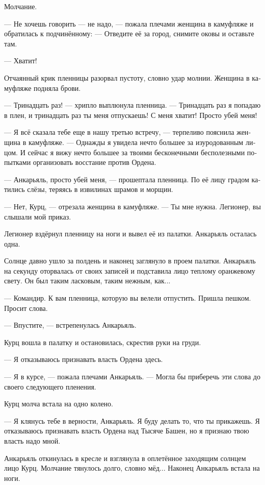 \documentclass[a4paper,10pt,fleqn]{book}\usepackage{polyglossia}\setdefaultlanguage[babelshorthands=true]{russian}\setotherlanguage{english}\defaultfontfeatures{Ligatures=TeX,Mapping=tex-text}\usepackage{xcolor}\newcommand{\ml}[3]{#2}
\begin{document}
Молчание.

--- Не хочешь говорить --- не надо, --- пожала плечами женщина в камуфляже и обратилась к подчинённому:
--- Отведите её за город, снимите оковы и оставьте там.

--- Хватит!

Отчаянный крик пленницы разорвал пустоту, словно удар молнии.
Женщина в камуфляже подняла брови.

--- Тринадцать раз! --- хрипло выплюнула пленница.
--- Тринадцать раз я попадаю в плен, и тринадцать раз ты меня отпускаешь!
С меня хватит!
Просто убей меня!

--- Я всё сказала тебе еще в нашу третью встречу, --- терпеливо пояснила женщина в камуфляже.
--- Однажды я увидела нечто большее за изуродованным лицом.
И сейчас я вижу нечто большее за твоими бесконечными бесполезными попытками организовать восстание против Ордена.

--- Анкарьяль, просто убей меня, --- прошептала пленница.
По её лицу градом катились слёзы, теряясь в извилинах шрамов и морщин.

--- Нет, Курц, --- отрезала женщина в камуфляже.
--- Ты мне нужна.
Легионер, вы слышали мой приказ.

Легионер вздёрнул пленницу на ноги и вывел её из палатки.
Анкарьяль осталась одна.

Солнце давно ушло за полдень и наконец заглянуло в проем палатки.
Анкарьяль на секунду оторвалась от своих записей и подставила лицо теплому оранжевому свету.
Он был таким ласковым, таким нежным, как...

--- Командир.
К вам пленница, которую вы велели отпустить.
Пришла пешком.
Просит слова.

--- Впустите, --- встрепенулась Анкарьяль.

Курц вошла в палатку и остановилась, скрестив руки на груди.

--- Я отказываюсь признавать власть Ордена здесь.

--- Я в курсе, --- пожала плечами Анкарьяль.
--- Могла бы приберечь эти слова до своего следующего пленения.

Курц молча встала на одно колено.

--- Я клянусь тебе в верности, Анкарьяль.
Я буду делать то, что ты прикажешь.
Я отказываюсь признавать власть Ордена над Тысяче Башен, но я признаю твою власть надо мной.

Анкарьяль откинулась в кресле и взглянула в оплетённое заходящим солнцем лицо Курц.
Молчание тянулось долго, словно мёд...
Наконец Анкарьяль встала на ноги.
\end{document}
